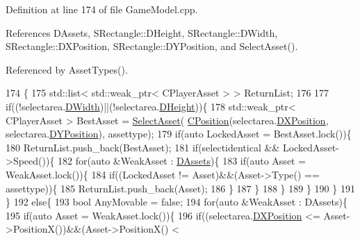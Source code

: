 Definition at line 174 of file Game\+Model.\+cpp.



References D\+Assets, S\+Rectangle\+::\+D\+Height, S\+Rectangle\+::\+D\+Width, S\+Rectangle\+::\+D\+X\+Position, S\+Rectangle\+::\+D\+Y\+Position, and Select\+Asset().



Referenced by Asset\+Types().


\begin{DoxyCode}
174                                                                                                            
                                   \{
175     std::list< std::weak\_ptr< CPlayerAsset > > ReturnList;
176     
177     \textcolor{keywordflow}{if}((!selectarea.\hyperlink{structSRectangle_a4150898b3f7d90f6e4b0d44bf1ae3bd2}{DWidth})||(!selectarea.\hyperlink{structSRectangle_a84ea3c2314c43cab6186170662188899}{DHeight}))\{
178         std::weak\_ptr< CPlayerAsset > BestAsset = \hyperlink{classCPlayerData_a1c926b101513f871ec85e34ac3c83ec4}{SelectAsset}(
      \hyperlink{classCPosition}{CPosition}(selectarea.\hyperlink{structSRectangle_abcbddb03b3ee416cc33109833b5f075c}{DXPosition}, selectarea.\hyperlink{structSRectangle_a120aa0a90033bc6e07c36c151a3bbc71}{DYPosition}), assettype);
179         \textcolor{keywordflow}{if}(\textcolor{keyword}{auto} LockedAsset = BestAsset.lock())\{
180             ReturnList.push\_back(BestAsset);
181             \textcolor{keywordflow}{if}(selectidentical && LockedAsset->Speed())\{
182                 \textcolor{keywordflow}{for}(\textcolor{keyword}{auto} &WeakAsset : \hyperlink{classCPlayerData_a1d7dd355facf52db6242e3554373906c}{DAssets})\{
183                     \textcolor{keywordflow}{if}(\textcolor{keyword}{auto} Asset = WeakAsset.lock())\{
184                         \textcolor{keywordflow}{if}((LockedAsset != Asset)&&(Asset->Type() == assettype))\{
185                             ReturnList.push\_back(Asset);   
186                         \}
187                     \}
188                 \}
189             \}
190         \}
191     \}
192     \textcolor{keywordflow}{else}\{
193         \textcolor{keywordtype}{bool} AnyMovable = \textcolor{keyword}{false};
194         \textcolor{keywordflow}{for}(\textcolor{keyword}{auto} &WeakAsset : DAssets)\{
195             \textcolor{keywordflow}{if}(\textcolor{keyword}{auto} Asset = WeakAsset.lock())\{
196                 \textcolor{keywordflow}{if}((selectarea.\hyperlink{structSRectangle_abcbddb03b3ee416cc33109833b5f075c}{DXPosition} <= Asset->PositionX())&&(Asset->PositionX() < 

\end{DoxyCode}
